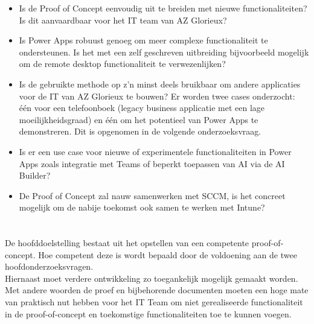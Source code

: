 \begin{itemize}[label={$\circ$}]
    \item Is de Proof of Concept eenvoudig uit te breiden met nieuwe functionaliteiten? Is dit aanvaardbaar voor het IT team van AZ Glorieux?
    \item Is Power Apps robuust genoeg om meer complexe functionaliteit te ondersteunen. Is het met een zelf geschreven uitbreiding bijvoorbeeld mogelijk om de remote desktop functionaliteit te verwezenlijken?
    \item Is de gebruikte methode op z'n minst deels bruikbaar om andere applicaties voor de IT van AZ Glorieux te bouwen? Er worden twee cases onderzocht: één voor een telefoonboek (legacy business applicatie met een lage moeilijkheidsgraad) en één om het potentieel van Power Apps te demonstreren. Dit is opgenomen in de volgende onderzoeksvraag.
    \item Is er een use case voor nieuwe of experimentele functionaliteiten in Power Apps zoals integratie met Teams of beperkt toepassen van AI via de AI Builder?
    \item De Proof of Concept zal nauw samenwerken met SCCM, is het concreet mogelijk om de nabije toekomst ook samen te werken met Intune?
\end{itemize}

\section{}
\label{sec:onderzoeksdoelstelling}

De hoofddoelstelling bestaat uit het opstellen van een competente proof-of-concept. Hoe competent deze is wordt bepaald door de voldoening aan de twee hoofdonderzoeksvragen.\\
Hiernaast moet verdere ontwikkeling zo toegankelijk mogelijk gemaakt worden. Met andere woorden de proef en bijbehorende documenten moeten een hoge mate van praktisch nut hebben voor het IT Team om niet gerealiseerde functionaliteit in de proof-of-concept en toekomstige functionaliteiten toe te kunnen voegen.


\section{}
\label{sec:opzet-bachelorproef}


